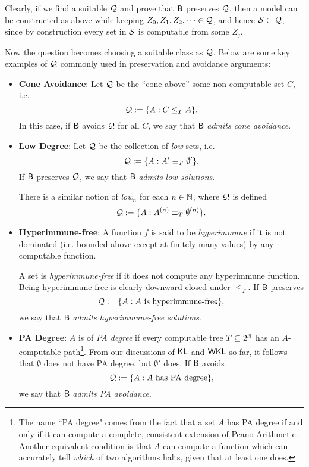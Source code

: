 \documentclass{amsart}
\begin{document}
	Clearly, if we find a suitable $\mathcal{Q}$ and prove that $\sf{B}$ preserves $\mathcal{Q}$, then a model can be constructed as above while keeping $Z_0,Z_1,Z_2,\dots \in \mathcal{Q}$, and hence $\mathcal{S}\subset \mathcal{Q}$, since by construction every set in $\mathcal{S}$ is computable from some $Z_j$. 
	
	Now the question becomes choosing a suitable class as $\mathcal{Q}$. Below are some key examples of $\mathcal{Q}$ commonly used in preservation and avoidance arguments:
	
	\begin{itemize}
		\item \textbf{Cone Avoidance}: Let $\mathcal{Q}$ be the ``cone above'' some non-computable set $C$, i.e.
		$$
		\mathcal{Q} := \{A:  C\leq_T A\}.
		$$
		In this case, if $\sf{B}$ avoids $\mathcal{Q}$ for all $C$, we say that $\sf{B}$ \textit{admits cone avoidance}. \\
		
		\item \textbf{Low Degree}: Let $\mathcal{Q}$ be the collection of \textit{low} sets, i.e.
		$$
		\mathcal{Q} := \{A: A'\equiv_T \emptyset'\}.
		$$
		If $\sf{B}$ preserves $\mathcal{Q}$, we say that $\sf{B}$ \textit{admits low solutions}.
		
		\noindent There is a similar notion of \textit{low}$_n$ for each $n\in\mathbb{N}$, where $\mathcal{Q}$ is defined
		$$
		\mathcal{Q} := \{A: A^{(n)}\equiv_T \emptyset^{(n)}\}.
		$$
		\item \textbf{Hyperimmune-free}: A function $f$ is said to be \textit{hyperimmune} if it is not dominated (i.e. bounded above except at finitely-many values) by any computable function. 
		
		A set is \textit{hyperimmune-free} if it does not compute any hyperimmune function. Being hyperimmune-free is clearly downward-closed under $\leq_T$. If $\sf{B}$ preserves
		$$
		\mathcal{Q} := \{A: A\text{ is hyperimmune-free}\},
		$$
		we say that $\sf{B}$ \textit{admits hyperimmune-free solutions}.\\
		
		\item \textbf{PA Degree}: $A$ is of \textit{PA degree} if every computable tree $T\subseteq 2^{\mathbb{N}}$ has an $A$-computable path\footnote{The name ``PA degree" comes from the fact that a set $A$ has PA degree if and only if it can compute a complete, consistent extension of Peano Arithmetic. Another equivalent condition is that $A$ can compute a function which can accurately tell \textit{which} of two algorithms halts, given that at least one does.}. From our discussions of $\operatorname{\sf{KL}}$ and $\sf{WKL}$ so far, it follows that $\emptyset$ does not have PA degree, but $\emptyset'$ does. If $\sf{B}$ avoids
		$$
		\mathcal{Q} := \{A: A \text{ has PA degree}\},
		$$
		we say that $\sf{B}$ \textit{admits PA avoidance}. 
	\end{itemize}
	
\end{document}
